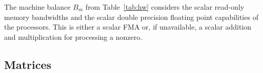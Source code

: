 The machine balance $B_m$ from Table~\ref{tab:hw} considers the scalar read-only
memory bandwidths and the scalar double precision floating point capabilities of
the processors. 
This is either a scalar FMA or, if unavailable, a scalar addition and
multiplication for processing a nonzero.

%



\subsection{Matrices}

